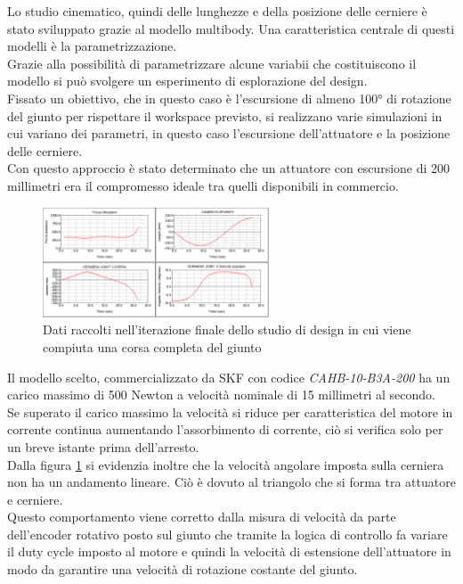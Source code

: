 \documentclass[%
corpo=11pt,
twoside,
 stile=classica,
oldstyle,
greek,%
]{toptesi}
\begin{document}
	Lo studio cinematico, quindi delle lunghezze e della posizione delle cerniere è stato sviluppato grazie al modello multibody. Una caratteristica centrale di questi modelli è la parametrizzazione.\\
	 Grazie alla possibilità di parametrizzare alcune variabii che costituiscono il modello si può svolgere un esperimento di esplorazione del design. \\
	Fissato un obiettivo, che in questo caso è l'escursione di almeno 100° di rotazione del giunto per rispettare il workspace previsto, si realizzano varie simulazioni in cui variano dei parametri, in questo caso l'escursione dell'attuatore e la posizione delle cerniere. \\
	Con questo approccio è stato determinato che un attuatore con escursione di 200 millimetri era il compromesso ideale tra quelli disponibili in commercio. 
	\begin{figure}
		\centering
		\includegraphics[width=0.6\textwidth]{Plots/GOMITO/Joint3.png}
		\caption{Dati raccolti nell'iterazione finale dello studio di design in cui viene compiuta una corsa completa del giunto }
		\label{fig:MBDLinear}
	\end{figure}
	Il modello scelto, commercializzato da SKF con codice \textit{CAHB-10-B3A-200} ha un carico massimo di 500 Newton a velocità nominale di 15 millimetri al secondo. \\
	Se superato il carico massimo la velocità si riduce per caratteristica del motore in corrente continua aumentando l'assorbimento di corrente, ciò si verifica solo per un breve istante prima dell'arresto.\\
	 Dalla figura \ref{fig:MBDLinear} si evidenzia inoltre che la velocità angolare imposta sulla cerniera non ha un andamento lineare. Ciò è dovuto al triangolo che si forma tra attuatore e cerniere. \\
	Questo comportamento viene corretto dalla misura di velocità da parte dell'encoder rotativo posto sul giunto che tramite la logica di controllo fa variare il duty cycle imposto al motore e quindi la velocità di estensione dell'attuatore in modo da garantire una velocità di rotazione costante del giunto. 
	
\end{document}
